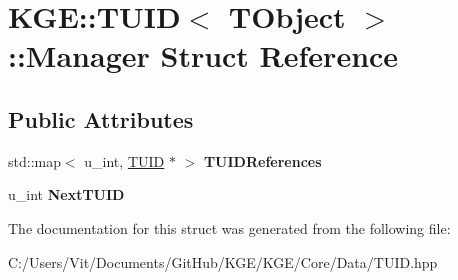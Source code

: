 \hypertarget{struct_k_g_e_1_1_t_u_i_d_1_1_manager}{\section{K\-G\-E\-:\-:T\-U\-I\-D$<$ T\-Object $>$\-:\-:Manager Struct Reference}
\label{struct_k_g_e_1_1_t_u_i_d_1_1_manager}
}
\subsection*{Public Attributes}
\begin{DoxyCompactItemize}
\item 
\hypertarget{struct_k_g_e_1_1_t_u_i_d_1_1_manager_a4b113f8d7d2a0717314789103b913c87}{std\-::map$<$ u\-\_\-int, \hyperlink{class_k_g_e_1_1_t_u_i_d}{T\-U\-I\-D} $\ast$ $>$ {\bfseries T\-U\-I\-D\-References}}\label{struct_k_g_e_1_1_t_u_i_d_1_1_manager_a4b113f8d7d2a0717314789103b913c87}

\item 
\hypertarget{struct_k_g_e_1_1_t_u_i_d_1_1_manager_aa2f8d824754dbb836f69faaa5a5a8a92}{u\-\_\-int {\bfseries Next\-T\-U\-I\-D}}\label{struct_k_g_e_1_1_t_u_i_d_1_1_manager_aa2f8d824754dbb836f69faaa5a5a8a92}

\end{DoxyCompactItemize}


The documentation for this struct was generated from the following file\-:\begin{DoxyCompactItemize}
\item 
C\-:/\-Users/\-Vit/\-Documents/\-Git\-Hub/\-K\-G\-E/\-K\-G\-E/\-Core/\-Data/T\-U\-I\-D.\-hpp\end{DoxyCompactItemize}
